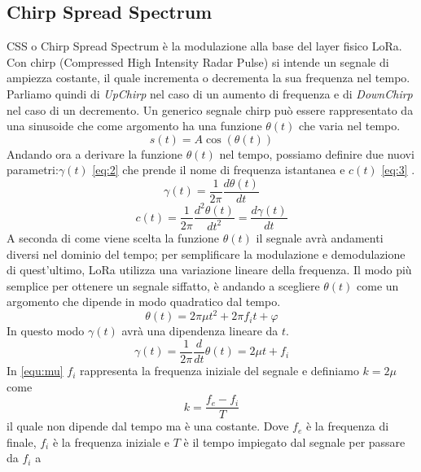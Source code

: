 \subsection{Chirp Spread Spectrum}
CSS o Chirp Spread Spectrum è la modulazione alla base del layer fisico LoRa. 
Con chirp (Compressed High Intensity Radar Pulse) si intende un segnale di
ampiezza costante, il quale incrementa o decrementa la sua frequenza nel tempo.
Parliamo quindi di \emph{UpChirp} nel caso di un aumento di frequenza e di
\emph{DownChirp} nel caso di un decremento.
Un generico segnale chirp può essere rappresentato da una sinusoide che come
argomento ha una funzione $\theta(t)$ che varia nel tempo.
\begin{equation}\label{eq:1}
        s(t) = A\cos(\theta (t))
\end{equation}
Andando ora a derivare la funzione  $\theta(t)$ nel tempo, possiamo  definire due
nuovi parametri:$\gamma(t)$ \ref{eq:2} che prende il nome di frequenza
istantanea e  $c(t)$ \ref{eq:3} .
\begin{equation}\label{eq:2}
        \gamma(t) = \frac{1}{2\pi} \frac{d\theta(t)}{dt}
\end{equation}
\begin{equation}\label{eq:3}
        c(t) = \frac{1}{2\pi}\frac{d^2\theta(t)}{dt^2} = \frac{d\gamma(t)}{dt}
\end{equation}
A seconda di come viene scelta la funzione $\theta(t)$ il segnale avrà
andamenti diversi nel dominio del tempo; per semplificare la modulazione e
demodulazione di quest'ultimo, LoRa utilizza una variazione lineare della frequenza.
Il modo più semplice per ottenere un segnale siffatto, è andando a scegliere $\theta(t)$
come un argomento che dipende in modo quadratico dal tempo.
\begin{equation}
        \theta(t) = 2\pi\mu t^2+2\pi f_it+\varphi
\end{equation}
In questo modo $\gamma(t)$ avrà una dipendenza lineare da $t$.
\begin{equation}\label{equ:mu}
        \gamma(t) = \frac{1}{2\pi}\frac{d}{dt}\theta(t)  = 2\mu t+ f_i
\end{equation}
In \ref{equ:mu} $f_i$ rappresenta la frequenza iniziale del segnale e definiamo
$k = 2\mu$ come 
\begin{equation}\label{equ:chirpizzazione}
        k =  \frac{f_e-f_i}{T}
\end{equation}
il quale non dipende dal tempo ma è una costante.  Dove $f_e$ è la frequenza di finale, $f_i$ è la
frequenza iniziale e $T$ è il tempo impiegato dal segnale per passare da $f_i$ a
